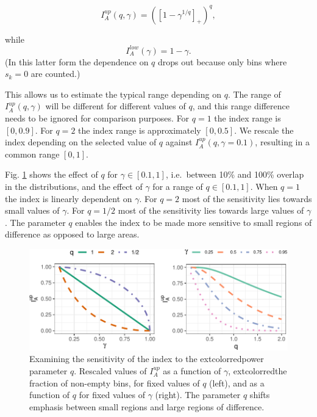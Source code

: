 \documentclass[]{interact}
\theoremstyle{plain}%
\theoremstyle{definition}
\theoremstyle{remark}
\begin{document}
\begin{equation}
I_A^{up}(q, \gamma) = ([1-\gamma^{1/q}]_+)^q,
\label{eq:p1}
\end{equation}

\noindent while \begin{equation}
I_A^{low}(\gamma) = 1-\gamma.
\end{equation} (In this latter form the dependence on \(q\) drops out
because only bins where \(s_k=0\) are counted.)

This allows us to estimate the typical range depending on \(q\). The
range of \(I_A^{up}(q, \gamma)\) will be different for different values
of \(q\), and this range difference needs to be ignored for comparison
purposes. For \(q=1\) the index range is \([0,0.9]\). For \(q=2\) the
index range is approximately \([0, 0.5]\). We rescale the index
depending on the selected value of \(q\) against
\(I_A^{up}(q, \gamma=0.1)\), resulting in a common range \([0,1]\).

Fig. \ref{fig:behavior} shows the effect of \(q\) for
\(\gamma \in [0.1, 1]\), i.e.~between 10\% and 100\% overlap in the
distributions, and the effect of \(\gamma\) for a range of
\(q \in [0.1, 1]\). When \(q=1\) the index is linearly dependent on
\(\gamma\). For \(q=2\) most of the sensitivity lies towards small
values of \(\gamma\). For \(q=1/2\) most of the sensitivity lies towards
large values of \(\gamma\). The parameter \(q\) enables the index to be
made more sensitive to small regions of difference as opposed to large
areas.

\begin{figure}

{\centering \includegraphics[width=1\linewidth]{section_pursuit_files/figure-latex/behavior-1} 

}

\caption{Examining the sensitivity of the index to the  extcolor{red}{power} parameter $q$. Rescaled values of $I_A^{up}$ as a function of $\gamma$,    extcolor{red}{the fraction of non-empty bins,} for fixed values of $q$ (left), and as a function of $q$ for fixed values of $\gamma$ (right). The parameter $q$ shifts emphasis between small regions and large regions of difference.}\label{fig:behavior}
\end{figure}
\end{document}
